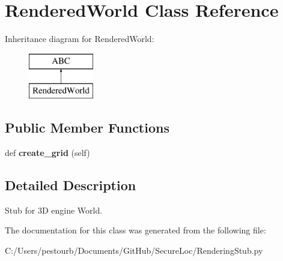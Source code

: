 \hypertarget{class_rendering_stub_1_1_rendered_world}{}\section{Rendered\+World Class Reference}
\label{class_rendering_stub_1_1_rendered_world}
Inheritance diagram for Rendered\+World\+:\begin{figure}[H]
\begin{center}
\leavevmode
\includegraphics[height=2.000000cm]{class_rendering_stub_1_1_rendered_world}
\end{center}
\end{figure}
\subsection*{Public Member Functions}
\begin{DoxyCompactItemize}
\item 
\mbox{\label{class_rendering_stub_1_1_rendered_world_a4c41b83d0d7ca78d6aa31cabe4cf0949}} 
def {\bfseries create\+\_\+grid} (self)
\end{DoxyCompactItemize}


\subsection{Detailed Description}
\begin{DoxyVerb}Stub for 3D engine World.\end{DoxyVerb}
 

The documentation for this class was generated from the following file\+:\begin{DoxyCompactItemize}
\item 
C\+:/\+Users/pestourb/\+Documents/\+Git\+Hub/\+Secure\+Loc/Rendering\+Stub.\+py\end{DoxyCompactItemize}
